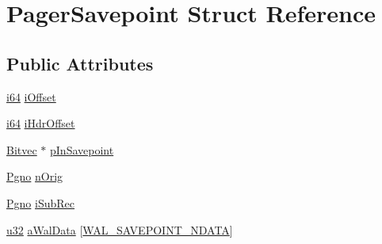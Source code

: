 \hypertarget{struct_pager_savepoint}{\section{Pager\-Savepoint Struct Reference}
\label{struct_pager_savepoint}
}
\subsection*{Public Attributes}
\begin{DoxyCompactItemize}
\item 
\hyperlink{sqlite3_8c_a2a0f0f4ae7001eb54351f77ea1cdbcfd}{i64} \hyperlink{struct_pager_savepoint_ab3ee7b75a10f47a82c8e3312bee6ad60}{i\-Offset}
\item 
\hyperlink{sqlite3_8c_a2a0f0f4ae7001eb54351f77ea1cdbcfd}{i64} \hyperlink{struct_pager_savepoint_ae1afd1cf4fba6f7efd232656366121d1}{i\-Hdr\-Offset}
\item 
\hyperlink{struct_bitvec}{Bitvec} $\ast$ \hyperlink{struct_pager_savepoint_abf7d6dc9d457c866727f84c4b9e0348f}{p\-In\-Savepoint}
\item 
\hyperlink{sqlite3_8c_aec0c653e8dd16e4639caf2f8ea54f55c}{Pgno} \hyperlink{struct_pager_savepoint_a944cca2844a51bdba253476f516b9865}{n\-Orig}
\item 
\hyperlink{sqlite3_8c_aec0c653e8dd16e4639caf2f8ea54f55c}{Pgno} \hyperlink{struct_pager_savepoint_ac1accce313b9da31631892e2cbe85a2f}{i\-Sub\-Rec}
\item 
\hyperlink{sqlite3_8c_a03ad5adfaeb9b7640dde78a0cc390319}{u32} \hyperlink{struct_pager_savepoint_ac96cff844a24378c426a9901517f1d6c}{a\-Wal\-Data} \mbox{[}\hyperlink{sqlite3_8c_a1406052a1dfd30c3c79af16f3487307e}{W\-A\-L\-\_\-\-S\-A\-V\-E\-P\-O\-I\-N\-T\-\_\-\-N\-D\-A\-T\-A}\mbox{]}
\end{DoxyCompactItemize}


